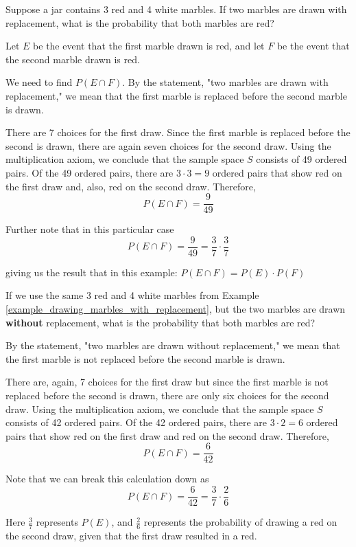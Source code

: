 \begin{example}\label{example_drawing_marbles_with_replacement}
    Suppose a jar contains 3 red and 4 white marbles. If two marbles are drawn with replacement, what is the probability that both marbles are red?
\end{example}
\begin{solution}
    Let \( E \) be the event that the first marble drawn is red, and let \( F \) be the event that the second marble drawn is red.

    We need to find \( P(E \cap F) \). By the statement, "two marbles are drawn with replacement," we mean that the first marble is replaced before the second marble is drawn.

    There are 7 choices for the first draw. Since the first marble is replaced before the second is drawn, there are again seven choices for the second draw. Using the multiplication axiom, we conclude that the sample space \( S \) consists of 49 ordered pairs. Of the 49 ordered pairs, there are \( 3 \cdot 3 = 9 \) ordered pairs that show red on the first draw and, also, red on the second draw. Therefore,
    \[ P(E \cap F) = \frac{9}{49} \]

    Further note that in this particular case
    \[ P(E \cap F) = \frac{9}{49} = \frac{3}{7} \cdot \frac{3}{7} \]

    giving us the result that in this example: \( P(E \cap F) = P(E) \cdot P(F) \)
\end{solution}

\begin{example}
    If we use the same 3 red and 4 white marbles from Example \ref{example_drawing_marbles_with_replacement}, but the two marbles are drawn \textbf{without} replacement, what is the probability that both marbles are red?
\end{example}

\begin{solution}
    By the statement, "two marbles are drawn without replacement," we mean that the first marble is not replaced before the second marble is drawn.

    There are, again, 7 choices for the first draw but since the first marble is not replaced before the second is drawn, there are only six choices for the second draw. Using the multiplication axiom, we conclude that the sample space \( S \) consists of 42 ordered pairs. Of the 42 ordered pairs, there are \( 3 \cdot 2 = 6 \) ordered pairs that show red on the first draw and red on the second draw. Therefore,
    \[ P(E \cap F) = \frac{6}{42} \]

    Note that we can break this calculation down as
    \[ P(E \cap F) = \frac{6}{42} = \frac{3}{7} \cdot \frac{2}{6} \]

    Here \( \frac{3}{7} \) represents \( P(E) \), and \( \frac{2}{6} \) represents the probability of drawing a red on the second draw, given that the first draw resulted in a red.
\end{solution}

